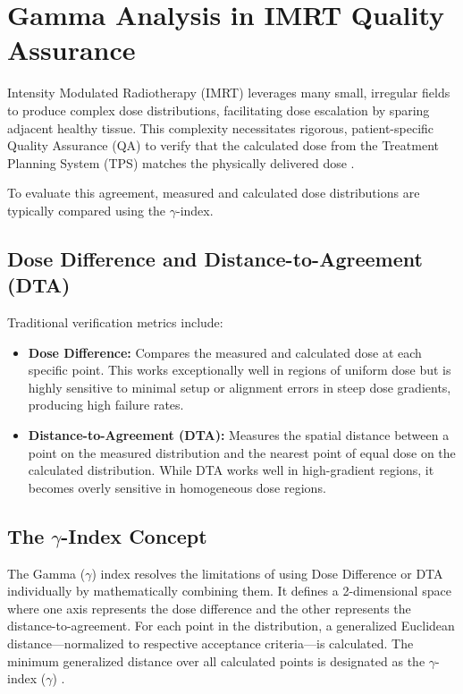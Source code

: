 \section{Gamma Analysis in IMRT Quality Assurance}

Intensity Modulated Radiotherapy (IMRT) leverages many small, irregular fields to produce complex dose distributions, facilitating dose escalation by sparing adjacent healthy tissue. This complexity necessitates rigorous, patient-specific Quality Assurance (QA) to verify that the calculated dose from the Treatment Planning System (TPS) matches the physically delivered dose \cite{qa_imrt_omp}.

To evaluate this agreement, measured and calculated dose distributions are typically compared using the $\gamma$-index.

\subsection{Dose Difference and Distance-to-Agreement (DTA)}
Traditional verification metrics include:
\begin{itemize}
    \item \textbf{Dose Difference:} Compares the measured and calculated dose at each specific point. This works exceptionally well in regions of uniform dose but is highly sensitive to minimal setup or alignment errors in steep dose gradients, producing high failure rates.
    \item \textbf{Distance-to-Agreement (DTA):} Measures the spatial distance between a point on the measured distribution and the nearest point of equal dose on the calculated distribution. While DTA works well in high-gradient regions, it becomes overly sensitive in homogeneous dose regions.
\end{itemize}

\subsection{The $\gamma$-Index Concept}
The Gamma ($\gamma$) index resolves the limitations of using Dose Difference or DTA individually by mathematically combining them. It defines a 2-dimensional space where one axis represents the dose difference and the other represents the distance-to-agreement. For each point in the distribution, a generalized Euclidean distance—normalized to respective acceptance criteria—is calculated. The minimum generalized distance over all calculated points is designated as the $\gamma$-index ($\gamma$) \cite{qa_imrt_omp}.


